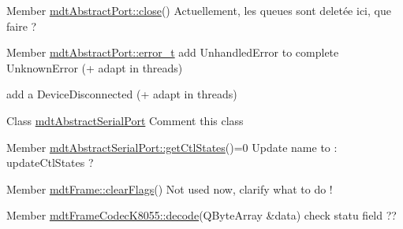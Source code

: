 \label{todo__todo000005}
\hypertarget{todo__todo000005}{}
 
\begin{DoxyDescription}
\item[Member \hyperlink{classmdt_abstract_port_a1ace1a2bd1a04f16952980e247b04800}{mdtAbstractPort::close}() ]Actuellement, les queues sont deletée ici, que faire ? 
\end{DoxyDescription}

\label{todo__todo000004}
\hypertarget{todo__todo000004}{}
 
\begin{DoxyDescription}
\item[Member \hyperlink{classmdt_abstract_port_ad4121bb930c95887e77f8bafa065a85e}{mdtAbstractPort::error\_\-t} ]add UnhandledError to complete UnknownError (+ adapt in threads) 

add a DeviceDisconnected (+ adapt in threads) 
\end{DoxyDescription}

\label{todo__todo000026}
\hypertarget{todo__todo000026}{}
 
\begin{DoxyDescription}
\item[Class \hyperlink{classmdt_abstract_serial_port}{mdtAbstractSerialPort} ]Comment this class 
\end{DoxyDescription}

\label{todo__todo000027}
\hypertarget{todo__todo000027}{}
 
\begin{DoxyDescription}
\item[Member \hyperlink{classmdt_abstract_serial_port_aaeacd26b220ab0f8c521cef74edfafdd}{mdtAbstractSerialPort::getCtlStates}()=0 ]Update name to : updateCtlStates ? 
\end{DoxyDescription}

\label{todo__todo000028}
\hypertarget{todo__todo000028}{}
 
\begin{DoxyDescription}
\item[Member \hyperlink{classmdt_frame_ae068ca1ae47516306f5180ffc1712d78}{mdtFrame::clearFlags}() ]Not used now, clarify what to do ! 
\end{DoxyDescription}

\label{todo__todo000029}
\hypertarget{todo__todo000029}{}
 
\begin{DoxyDescription}
\item[Member \hyperlink{classmdt_frame_codec_k8055_a9dfe60529b0e80d5bbd3852fdea51b18}{mdtFrameCodecK8055::decode}(QByteArray \&data) ]check statu field ?? 
\end{DoxyDescription}

